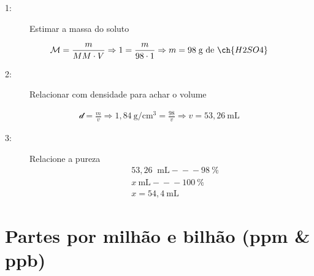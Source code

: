 \documentclass[presentation,professionalfonts,aspectratio=169]{beamer}
\begin{document}
\begin{frame}[label={sec:org9147d8a}]{}
\begin{answer}[print=true]
\scriptsize
\begin{description}
\item[{1:}] Estimar a massa do soluto
\end{description}
\begin{align*}
\mathcal{M}=\frac{m}{MM \cdot V} \Rightarrow 1 = \frac{m}{98 \cdot 1 } \Rightarrow m = 98 \; \text{g de}~ \ch{H2SO4}
\end{align*}
\begin{description}
\item[{2:}] Relacionar com densidade para achar o volume
\end{description}
\begin{align*}
\mathcal{d}=\frac{m}{v} \Rightarrow 1,84 ~\text{g/cm$^3$}=\frac{98}{v} \Rightarrow v=53,26 ~\text{mL}  
\end{align*}
\begin{description}
\item[{3:}] Relacione a pureza
\begin{align*}
& 53,26~\text{ mL} -\!\!\!-\!\!\!- 98~\text{\%}\\
& x~\text{mL} -\!\!\!-\!\!\!- 100~\text{\%}\\
& x= 54,4 ~\text{mL}
\end{align*}
\end{description}
\end{answer}
\end{frame}


\section{Partes por milhão e bilhão (ppm \& ppb)}
\label{sec:org8abc208}
\end{document}

